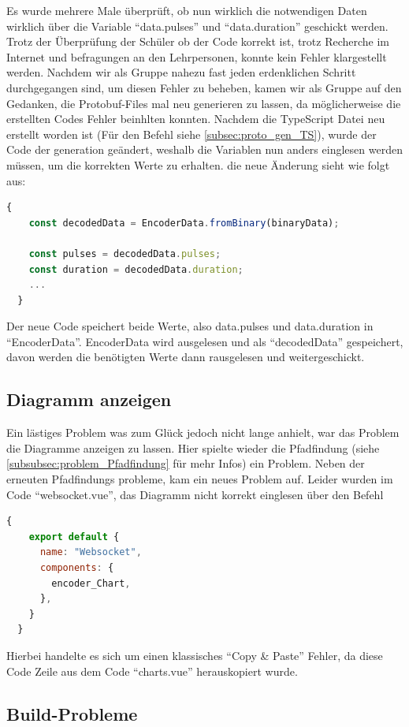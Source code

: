 Es wurde mehrere Male überprüft, ob nun wirklich die notwendigen Daten wirklich über die Variable 
``data.pulses'' und ``data.duration'' geschickt werden. 
%
Trotz der Überprüfung der Schüler ob der Code korrekt ist, 
trotz Recherche im Internet und befragungen an den Lehrpersonen, konnte kein Fehler klargestellt werden.
%
Nachdem wir als Gruppe nahezu fast jeden erdenklichen Schritt durchgegangen sind, um diesen Fehler zu beheben,
kamen wir als Gruppe auf den Gedanken, die Protobuf-Files mal neu generieren zu lassen, da möglicherweise 
%
die erstellten Codes Fehler beinhlten konnten. 
%
Nachdem die TypeScript Datei neu erstellt worden ist (Für den Befehl siehe \ref{subsec:proto_gen_TS}),
wurde der Code der generation geändert, weshalb die Variablen nun anders einglesen werden müssen,
um die korrekten Werte zu erhalten.
%
die neue Änderung sieht wie folgt aus:
\begin{lstlisting}[language=JavaScript, gobble=4]
  {
    const decodedData = EncoderData.fromBinary(binaryData);

    const pulses = decodedData.pulses;
    const duration = decodedData.duration;
    ...
  }
\end{lstlisting}
Der neue Code speichert beide Werte, also data.pulses und data.duration in ``EncoderData''.
EncoderData wird ausgelesen und als ``decodedData'' gespeichert, davon werden die benötigten Werte
dann rausgelesen und weitergeschickt.

\subsection{Diagramm anzeigen}
\label{subsubsec:problem_chart_anzeige}

Ein lästiges Problem was zum Glück jedoch nicht lange anhielt, war das Problem die Diagramme anzeigen zu lassen.
Hier spielte wieder die Pfadfindung (siehe \ref{subsubsec:problem_Pfadfindung} für mehr Infos) ein Problem.
%
Neben der erneuten Pfadfindungs probleme, kam ein neues Problem auf. 
Leider wurden im Code ``websocket.vue'', das Diagramm nicht korrekt einglesen über den Befehl
\begin{lstlisting}[language=JavaScript, gobble=4]
  {
    export default {
      name: "Websocket",
      components: {
        encoder_Chart,
      },
    }
  }
\end{lstlisting}
Hierbei handelte es sich um einen klassisches ``Copy \& Paste'' Fehler, da diese Code Zeile aus dem Code
``charts.vue'' herauskopiert wurde.
%

\subsection{Build-Probleme}
\label{subsubsec:problem_Builden}

